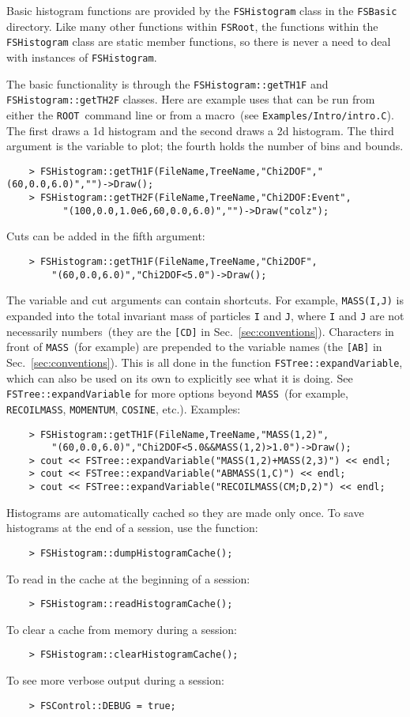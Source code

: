 \documentclass[11pt]{article}
\newcommand{\FSR}{{\tt FSRoot}}
\newcommand{\ROOT}{{\tt ROOT}}
\begin{document}
Basic histogram functions are provided by the {\tt FSHistogram} class in the {\tt FSBasic} directory.  Like many other functions within \FSR, the functions within the {\tt FSHistogram} class are static member functions, so there is never a need to deal with instances of {\tt FSHistogram}.

The basic functionality is through the {\tt FSHistogram::getTH1F} and {\tt FSHistogram::getTH2F} classes.  Here are example uses that can be run from either the \ROOT\ command line or from a macro~(see {\tt Examples/Intro/intro.C}).  The first draws a 1d histogram and the second draws a 2d histogram.  The third argument is the variable to plot; the fourth holds the number of bins and bounds.
\begin{verbatim}
    > FSHistogram::getTH1F(FileName,TreeName,"Chi2DOF","(60,0.0,6.0)","")->Draw();
    > FSHistogram::getTH2F(FileName,TreeName,"Chi2DOF:Event",
          "(100,0.0,1.0e6,60,0.0,6.0)","")->Draw("colz");
\end{verbatim}
Cuts can be added in the fifth argument:
\begin{verbatim}
    > FSHistogram::getTH1F(FileName,TreeName,"Chi2DOF",
        "(60,0.0,6.0)","Chi2DOF<5.0")->Draw();
\end{verbatim}
The variable and cut arguments can contain shortcuts.  For example, {\tt MASS(I,J)} is expanded into the total invariant mass of particles {\tt I} and {\tt J}, where {\tt I} and {\tt J} are not necessarily numbers~(they are the {\tt [CD]} in Sec.~\ref{sec:conventions}).  Characters in front of {\tt MASS}~(for example) are prepended to the variable names (the {\tt [AB]} in Sec.~\ref{sec:conventions}).  This is all done in the function {\tt FSTree::expandVariable}, which can also be used on its own to explicitly see what it is doing.    See {\tt FSTree::expandVariable} for more options beyond {\tt MASS}~(for example, {\tt RECOILMASS}, {\tt MOMENTUM}, {\tt COSINE}, etc.).  Examples:
\begin{verbatim}
    > FSHistogram::getTH1F(FileName,TreeName,"MASS(1,2)",
        "(60,0.0,6.0)","Chi2DOF<5.0&&MASS(1,2)>1.0")->Draw();
    > cout << FSTree::expandVariable("MASS(1,2)+MASS(2,3)") << endl;
    > cout << FSTree::expandVariable("ABMASS(1,C)") << endl;
    > cout << FSTree::expandVariable("RECOILMASS(CM;D,2)") << endl;
\end{verbatim}
Histograms are automatically cached so they are made only once.  To save histograms at the end of a session, use the function:
\begin{verbatim}
    > FSHistogram::dumpHistogramCache(); 
\end{verbatim}
To read in the cache at the beginning of a session:
\begin{verbatim}
    > FSHistogram::readHistogramCache(); 
\end{verbatim}
To clear a cache from memory during a session:
\begin{verbatim}
    > FSHistogram::clearHistogramCache(); 
\end{verbatim}
To see more verbose output during a session:
\begin{verbatim}
    > FSControl::DEBUG = true;
\end{verbatim}
\end{document}
